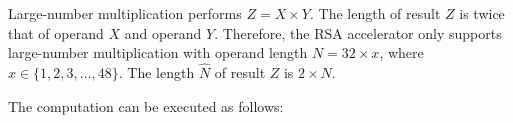 \documentclass[main\_\_EN.tex]{subfiles}
\begin{document}
Large-number multiplication performs \begin{math}Z = X \times Y\end{math}. The length of result \begin{math}Z\end{math} is twice that of operand \begin{math}X\end{math} and operand \begin{math}Y\end{math}. Therefore, the RSA accelerator only supports large-number multiplication with operand length \begin{math}N = 32 \times x\end{math}, where \begin{math}x \in \{ 1, 2, 3, \dots, 48\}\end{math}. The length \begin{math}\hat{N}\end{math} of result \begin{math}Z\end{math} is \begin{math}2 \times N\end{math}.

The computation can be executed as follows:
\end{document}
